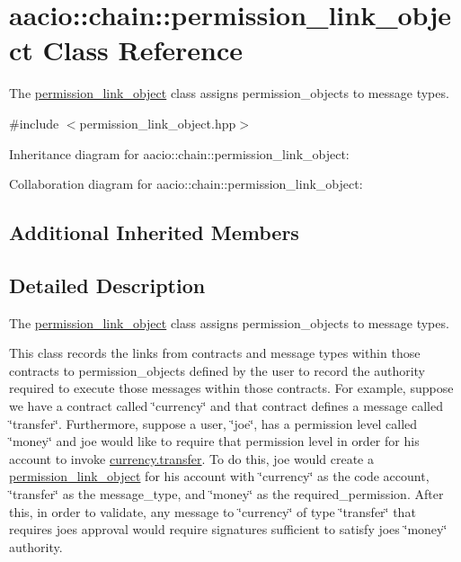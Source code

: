 \hypertarget{classaacio_1_1chain_1_1permission__link__object}{}\section{aacio\+:\+:chain\+:\+:permission\+\_\+link\+\_\+object Class Reference}
\label{classaacio_1_1chain_1_1permission__link__object}


The \mbox{\hyperlink{classaacio_1_1chain_1_1permission__link__object}{permission\+\_\+link\+\_\+object}} class assigns permission\+\_\+objects to message types.  




{\ttfamily \#include $<$permission\+\_\+link\+\_\+object.\+hpp$>$}



Inheritance diagram for aacio\+:\+:chain\+:\+:permission\+\_\+link\+\_\+object\+:


Collaboration diagram for aacio\+:\+:chain\+:\+:permission\+\_\+link\+\_\+object\+:
\subsection*{Additional Inherited Members}


\subsection{Detailed Description}
The \mbox{\hyperlink{classaacio_1_1chain_1_1permission__link__object}{permission\+\_\+link\+\_\+object}} class assigns permission\+\_\+objects to message types. 

This class records the links from contracts and message types within those contracts to permission\+\_\+objects defined by the user to record the authority required to execute those messages within those contracts. For example, suppose we have a contract called \char`\"{}currency\char`\"{} and that contract defines a message called \char`\"{}transfer\char`\"{}. Furthermore, suppose a user, \char`\"{}joe\char`\"{}, has a permission level called \char`\"{}money\char`\"{} and joe would like to require that permission level in order for his account to invoke \mbox{\hyperlink{structaacio_1_1currency_1_1transfer}{currency.\+transfer}}. To do this, joe would create a \mbox{\hyperlink{classaacio_1_1chain_1_1permission__link__object}{permission\+\_\+link\+\_\+object}} for his account with \char`\"{}currency\char`\"{} as the code account, \char`\"{}transfer\char`\"{} as the message\+\_\+type, and \char`\"{}money\char`\"{} as the required\+\_\+permission. After this, in order to validate, any message to \char`\"{}currency\char`\"{} of type \char`\"{}transfer\char`\"{} that requires joe\textquotesingle{}s approval would require signatures sufficient to satisfy joe\textquotesingle{}s \char`\"{}money\char`\"{} authority.

